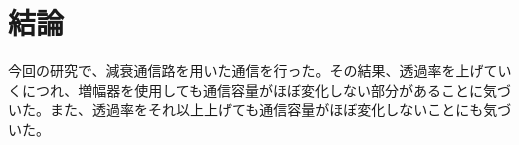 \chapter{結論}
今回の研究で、減衰通信路を用いた通信を行った。その結果、透過率を上げていくにつれ、増幅器を使用しても通信容量がほぼ変化しない部分があることに気づいた。また、透過率をそれ以上上げても通信容量がほぼ変化しないことにも気づいた。